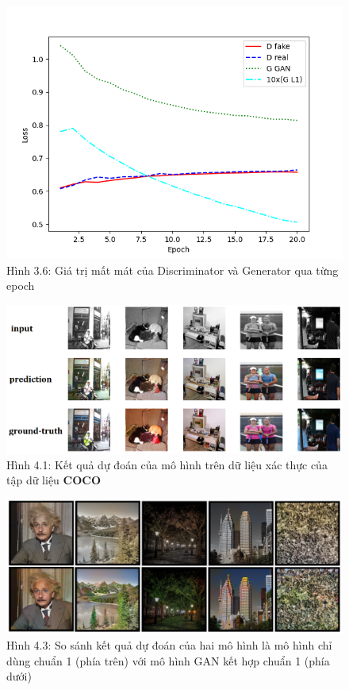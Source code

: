 \documentclass[a4paper]{article}
\begin{document}
\begin{figure}[h!]
\centering
\includegraphics[width=15cm]{images/3_6.png}
\caption*{Hình 3.6: Giá trị mất mát của Discriminator và Generator qua từng epoch}
\end{figure}

\begin{figure}[h!]
\centering
\includegraphics[width=14.4cm]{images/4_1.png}
\caption*{Hình 4.1: Kết quả dự đoán của mô hình trên dữ liệu xác thực của tập dữ liệu \textbf{COCO}}
\end{figure}

\begin{figure}[h!]
\centering
\includegraphics[width=16cm]{images/4_3.PNG}
\caption*{Hình 4.3: So sánh kết quả dự đoán của hai mô hình là mô hình chỉ dùng chuẩn 1 (phía trên) với mô hình GAN kết hợp chuẩn 1 (phía dưới)}
\end{figure}
\end{document}
